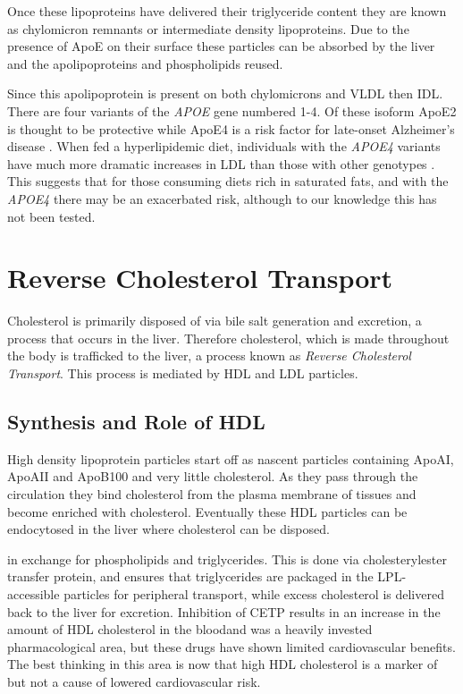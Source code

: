\documentclass{tufte-handout}
\begin{document}
  Once these lipoproteins have delivered their triglyceride content they are known as chylomicron remnants or intermediate density lipoproteins.  Due to the presence of ApoE on their surface these particles can be absorbed by the liver and the apolipoproteins and phospholipids reused.

  Since this apolipoprotein is present on both chylomicrons and VLDL then IDL.  There are four variants of the \textit{APOE} gene numbered 1-4.  Of these isoform ApoE2 is thought to be protective while ApoE4 is a risk factor for late-onset Alzheimer's disease \citep{Poirier1993,Corder1993}.  When fed a hyperlipidemic diet, individuals with the \textit{APOE4} variants have much more dramatic increases in LDL than those with other genotypes \citep{Lehtimaki1992}.  This suggests that for those consuming diets rich in saturated fats, and with the \textit{APOE4} there may be an exacerbated risk, although to our knowledge this has not been tested.

\section{Reverse Cholesterol Transport}

Cholesterol is primarily disposed of via bile salt generation and excretion, a process that occurs in the liver.  Therefore cholesterol, which is made throughout the body is trafficked to the liver, a process known as \emph{Reverse Cholesterol Transport}.  This process is mediated by HDL and LDL particles.

\subsection{Synthesis and Role of HDL}

High density lipoprotein particles start off as nascent particles containing ApoAI, ApoAII and ApoB100 and very little cholesterol.  As they pass through the circulation they bind cholesterol from the plasma membrane of tissues and become enriched with cholesterol.  Eventually these HDL particles can be endocytosed in the liver where cholesterol can be disposed.

 in exchange for phospholipids and triglycerides.  This is done via cholesterylester transfer protein, and ensures that triglycerides are packaged in the LPL-accessible particles for peripheral transport, while excess cholesterol is delivered back to the liver for excretion.   Inhibition of CETP results in an increase in the amount of  HDL cholesterol in the bloodand was a heavily invested pharmacological area, but these drugs have shown limited cardiovascular benefits.  The best thinking in this area is now that high HDL cholesterol is a marker of but not a cause of lowered cardiovascular risk.
\end{document}
